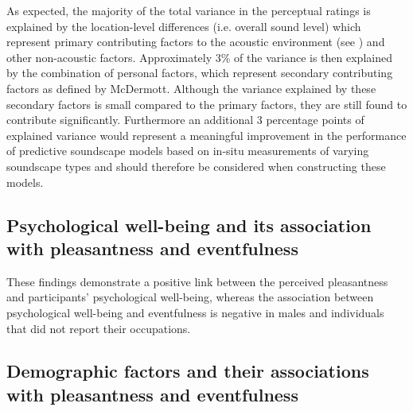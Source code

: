 As expected, the majority of the total variance in the perceptual ratings is explained by the location-level differences (i.e. overall sound level) which represent primary contributing factors to the acoustic environment (see \citep{McDermott2012Auditory}) and other non-acoustic factors. Approximately 3\% of the variance is then explained by the combination of personal factors, which represent secondary contributing factors as defined by McDermott. Although the variance explained by these secondary factors is small compared to the primary factors, they are still found to contribute significantly. Furthermore an additional 3 percentage points of explained variance would represent a meaningful improvement in the performance of predictive soundscape models based on in-situ measurements of varying soundscape types \citep{Lionello2020systematic} and should therefore be considered when constructing these models.

\subsection{Psychological well-being and its association with pleasantness and eventfulness}

These findings demonstrate a positive link between the perceived pleasantness and participants' psychological well-being, whereas the association between psychological well-being and eventfulness is negative in males and individuals that did not report their occupations. 

\subsection{Demographic factors and their associations with pleasantness and eventfulness}


